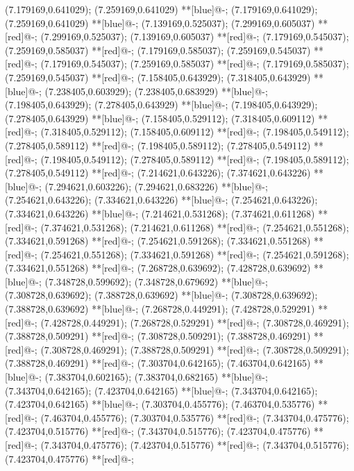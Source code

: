(7.179169,0.641029); (7.259169,0.641029) **[blue]@{-};
(7.179169,0.641029); (7.259169,0.641029) **[blue]@{-};
(7.139169,0.525037); (7.299169,0.605037) **[red]@{-};
(7.299169,0.525037); (7.139169,0.605037) **[red]@{-};
(7.179169,0.545037); (7.259169,0.585037) **[red]@{-};
(7.179169,0.585037); (7.259169,0.545037) **[red]@{-};
(7.179169,0.545037); (7.259169,0.585037) **[red]@{-};
(7.179169,0.585037); (7.259169,0.545037) **[red]@{-};
(7.158405,0.643929); (7.318405,0.643929) **[blue]@{-};
(7.238405,0.603929); (7.238405,0.683929) **[blue]@{-};
(7.198405,0.643929); (7.278405,0.643929) **[blue]@{-};
(7.198405,0.643929); (7.278405,0.643929) **[blue]@{-};
(7.158405,0.529112); (7.318405,0.609112) **[red]@{-};
(7.318405,0.529112); (7.158405,0.609112) **[red]@{-};
(7.198405,0.549112); (7.278405,0.589112) **[red]@{-};
(7.198405,0.589112); (7.278405,0.549112) **[red]@{-};
(7.198405,0.549112); (7.278405,0.589112) **[red]@{-};
(7.198405,0.589112); (7.278405,0.549112) **[red]@{-};
(7.214621,0.643226); (7.374621,0.643226) **[blue]@{-};
(7.294621,0.603226); (7.294621,0.683226) **[blue]@{-};
(7.254621,0.643226); (7.334621,0.643226) **[blue]@{-};
(7.254621,0.643226); (7.334621,0.643226) **[blue]@{-};
(7.214621,0.531268); (7.374621,0.611268) **[red]@{-};
(7.374621,0.531268); (7.214621,0.611268) **[red]@{-};
(7.254621,0.551268); (7.334621,0.591268) **[red]@{-};
(7.254621,0.591268); (7.334621,0.551268) **[red]@{-};
(7.254621,0.551268); (7.334621,0.591268) **[red]@{-};
(7.254621,0.591268); (7.334621,0.551268) **[red]@{-};
(7.268728,0.639692); (7.428728,0.639692) **[blue]@{-};
(7.348728,0.599692); (7.348728,0.679692) **[blue]@{-};
(7.308728,0.639692); (7.388728,0.639692) **[blue]@{-};
(7.308728,0.639692); (7.388728,0.639692) **[blue]@{-};
(7.268728,0.449291); (7.428728,0.529291) **[red]@{-};
(7.428728,0.449291); (7.268728,0.529291) **[red]@{-};
(7.308728,0.469291); (7.388728,0.509291) **[red]@{-};
(7.308728,0.509291); (7.388728,0.469291) **[red]@{-};
(7.308728,0.469291); (7.388728,0.509291) **[red]@{-};
(7.308728,0.509291); (7.388728,0.469291) **[red]@{-};
(7.303704,0.642165); (7.463704,0.642165) **[blue]@{-};
(7.383704,0.602165); (7.383704,0.682165) **[blue]@{-};
(7.343704,0.642165); (7.423704,0.642165) **[blue]@{-};
(7.343704,0.642165); (7.423704,0.642165) **[blue]@{-};
(7.303704,0.455776); (7.463704,0.535776) **[red]@{-};
(7.463704,0.455776); (7.303704,0.535776) **[red]@{-};
(7.343704,0.475776); (7.423704,0.515776) **[red]@{-};
(7.343704,0.515776); (7.423704,0.475776) **[red]@{-};
(7.343704,0.475776); (7.423704,0.515776) **[red]@{-};
(7.343704,0.515776); (7.423704,0.475776) **[red]@{-};
